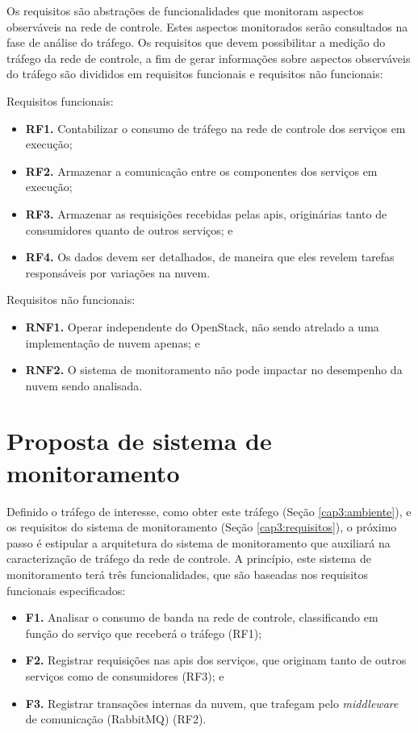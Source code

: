 Os requisitos são abstrações de funcionalidades que monitoram aspectos observáveis na rede de controle.
%
Estes aspectos monitorados serão consultados na fase de análise do tráfego.
%
Os requisitos que devem possibilitar a medição do tráfego da rede de controle, a fim de gerar informações sobre aspectos observáveis do tráfego são divididos em requisitos funcionais e requisitos não funcionais:

Requisitos funcionais:
\begin{itemize}
	\item \textbf{RF1.} Contabilizar o consumo de tráfego na rede de controle dos serviços em execução;
    \item \textbf{RF2.} Armazenar a comunicação entre os componentes dos serviços em execução;
    \item \textbf{RF3.} Armazenar as requisições recebidas pelas \acp{api}, originárias tanto de consumidores quanto de outros serviços; e
    \item \textbf{RF4.} Os dados devem ser detalhados, de maneira que eles revelem tarefas responsáveis por variações na nuvem.
\end{itemize}

Requisitos não funcionais:
\begin{itemize}
	\item \textbf{RNF1.} Operar independente do OpenStack, não sendo atrelado a uma implementação de nuvem apenas; e
    \item \textbf{RNF2.} O sistema de monitoramento não pode impactar no desempenho da nuvem sendo analisada.
\end{itemize}


\section{Proposta de sistema de monitoramento}
\label{cap3:monitoramento}

Definido o tráfego de interesse, como obter este tráfego (Seção \ref{cap3:ambiente}), e os requisitos do sistema de monitoramento (Seção \ref{cap3:requisitos}), o próximo passo é estipular a arquitetura do sistema de monitoramento que auxiliará na caracterização de tráfego da rede de controle.
%
A princípio, este sistema de monitoramento terá três funcionalidades, que são baseadas nos requisitos funcionais especificados:

\begin{itemize}
  \item \textbf{F1.} Analisar o consumo de banda na rede de controle, classificando em função do serviço que receberá o tráfego (RF1);
  \item \textbf{F2.} Registrar requisições nas \acp{api} dos serviços, que originam tanto de outros serviços como de consumidores (RF3); e
  \item \textbf{F3.} Registrar transações internas da nuvem, que trafegam pelo \textit{middleware} de comunicação (RabbitMQ) (RF2).
\end{itemize}

